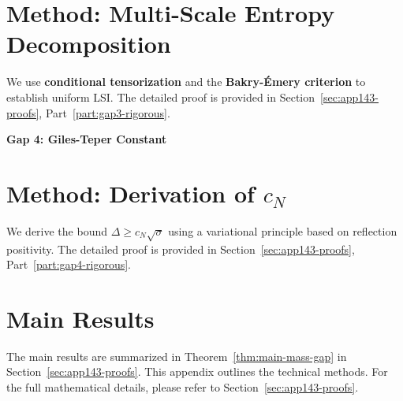 \section{Method: Multi-Scale Entropy Decomposition}
\label{sec:multiscale-entropy}

We use \textbf{conditional tensorization} and the \textbf{Bakry-\'Emery criterion} to establish uniform LSI.
The detailed proof is provided in Section~\ref{sec:app143-proofs}, Part~\ref{part:gap3-rigorous}.

\begin{center}
\LARGE \textbf{Gap 4: Giles-Teper Constant}
\end{center}
\label{part:gap4-definitive}

\section{Method: Derivation of \texorpdfstring{$c_N$}{c\_N}}
\label{sec:giles-teper-rigorous-app142}
\label{sec:gap4-resolution}

We derive the bound $\Delta \geq c_N \sqrt{\sigma}$ using a variational principle based on reflection positivity.
The detailed proof is provided in Section~\ref{sec:app143-proofs}, Part~\ref{part:gap4-rigorous}.

\section{Main Results}
\label{sec:summary-gaps-closed}

The main results are summarized in Theorem~\ref{thm:main-mass-gap} in Section~\ref{sec:app143-proofs}.
This appendix outlines the technical methods. For the full mathematical details, please refer to Section~\ref{sec:app143-proofs}.


